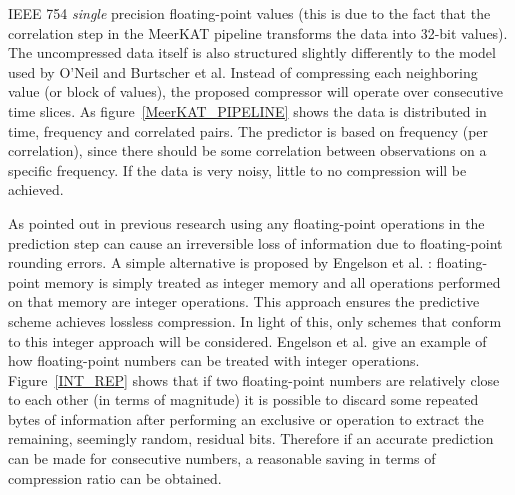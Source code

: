 IEEE 754 \textit{single} precision floating-point values (this is due to the fact that the correlation step in the MeerKAT pipeline transforms the data into 32-bit values). 
The uncompressed data itself is also structured slightly differently to the model used by O'Neil and Burtscher et al. Instead of compressing each neighboring value (or 
block of values), the proposed compressor will operate over consecutive time slices. As figure~\ref{MeerKAT_PIPELINE} shows the data is distributed in time, frequency and correlated pairs. 
The predictor is based on frequency (per correlation), since there should be some correlation between observations on a specific frequency. If the data is very noisy, little to no 
compression will be achieved. 

As pointed out in previous research \cite{engelson2000lossless,lindstrom2006fast} using any floating-point operations in the prediction step can cause an irreversible loss of information due to floating-point
rounding errors. A simple alternative is proposed by Engelson et al. \cite{engelson2000lossless}: floating-point memory is simply treated as integer memory and all operations performed on that memory 
are integer operations. This approach ensures the predictive scheme achieves lossless compression. In light of this, only schemes that conform to this integer approach will be considered. Engelson et al. give an example 
of how floating-point numbers can be treated with integer operations. Figure~\ref{INT_REP} shows that if two floating-point numbers are relatively close to each other (in terms of magnitude) it is possible to discard 
some repeated bytes of information after performing an exclusive or operation to extract the remaining, seemingly random, residual bits. Therefore if an accurate prediction can be made for consecutive numbers, a 
reasonable saving in terms of compression ratio can be obtained.

